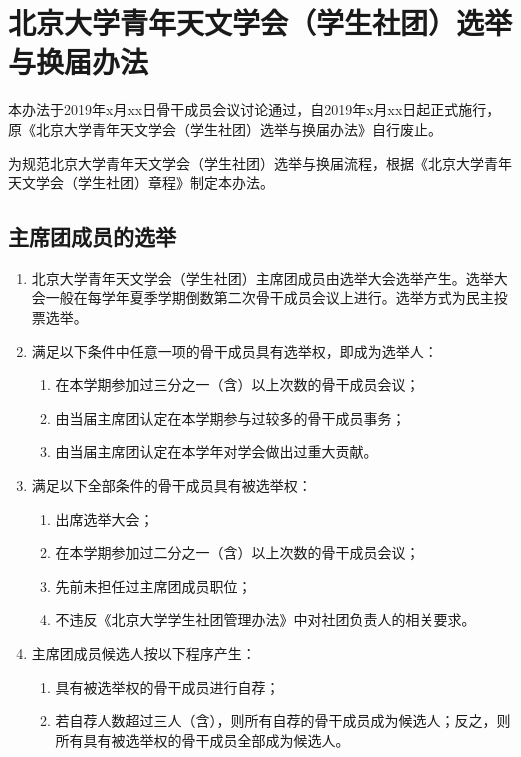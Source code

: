 \chapter{北京大学青年天文学会（学生社团）选举与换届办法}

本办法于2019年x月xx日骨干成员会议讨论通过，自2019年x月xx日起正式施行，原《北京大学青年天文学会（学生社团）选举与换届办法》自行废止。

为规范北京大学青年天文学会（学生社团）选举与换届流程，根据《北京大学青年天文学会（学生社团）章程》制定本办法。

\section{主席团成员的选举}

\begin{enumerate}
    \item 北京大学青年天文学会（学生社团）主席团成员由选举大会选举产生。选举大会一般在每学年夏季学期倒数第二次骨干成员会议上进行。选举方式为民主投票选举。
    
    \item 满足以下条件中任意一项的骨干成员具有选举权，即成为选举人：
    
    \begin{enumerate}
        \item 在本学期参加过三分之一（含）以上次数的骨干成员会议；
        \item 由当届主席团认定在本学期参与过较多的骨干成员事务；
        \item 由当届主席团认定在本学年对学会做出过重大贡献。
    \end{enumerate}
    
    \item 满足以下全部条件的骨干成员具有被选举权：
    
    \begin{enumerate}
        \item 出席选举大会；
        \item 在本学期参加过二分之一（含）以上次数的骨干成员会议；
        \item 先前未担任过主席团成员职位；
        \item 不违反《北京大学学生社团管理办法》中对社团负责人的相关要求。
    \end{enumerate}
    
    \item 主席团成员候选人按以下程序产生：
    
    \begin{enumerate}
        \item 具有被选举权的骨干成员进行自荐；
        \item 若自荐人数超过三人（含），则所有自荐的骨干成员成为候选人；反之，则所有具有被选举权的骨干成员全部成为候选人。
    \end{enumerate}
    

\end{enumerate}
